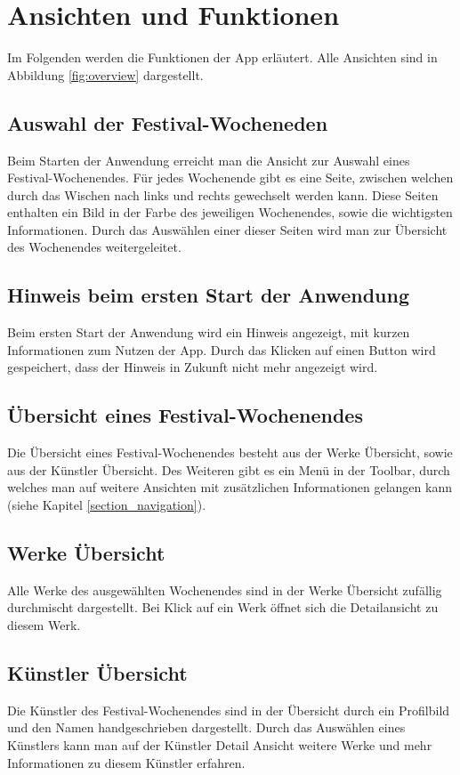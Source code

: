 \section{Ansichten und Funktionen}
Im Folgenden werden die Funktionen der App erläutert. Alle Ansichten sind in Abbildung \ref{fig:overview} dargestellt.

\subsection{Auswahl der Festival-Wocheneden}
Beim Starten der Anwendung erreicht man die Ansicht zur Auswahl eines Festival-Wochenendes. Für jedes Wochenende gibt es eine Seite, zwischen welchen durch das Wischen nach links und rechts gewechselt werden kann. Diese Seiten enthalten ein Bild in der Farbe des jeweiligen Wochenendes, sowie die wichtigsten Informationen. Durch das Auswählen einer dieser Seiten wird man zur Übersicht des Wochenendes weitergeleitet.

\subsection{Hinweis beim ersten Start der Anwendung}
Beim ersten Start der Anwendung wird ein Hinweis angezeigt, mit kurzen Informationen zum Nutzen der App. Durch das Klicken auf einen Button wird gespeichert, dass der Hinweis in Zukunft nicht mehr angezeigt wird.

\subsection{Übersicht eines Festival-Wochenendes}
Die Übersicht eines Festival-Wochenendes besteht aus der Werke Übersicht, sowie aus der Künstler Übersicht. Des Weiteren gibt es ein Menü in der Toolbar, durch welches man auf weitere Ansichten mit zusätzlichen Informationen gelangen kann (siehe Kapitel \ref{section_navigation}).

\subsection{Werke Übersicht}
Alle Werke des ausgewählten Wochenendes sind in der Werke Übersicht zufällig durchmischt dargestellt. Bei Klick auf ein Werk öffnet sich die Detailansicht zu diesem Werk.

\subsection{Künstler Übersicht}
Die Künstler des Festival-Wochenendes sind in der Übersicht durch ein Profilbild und den Namen handgeschrieben dargestellt. Durch das Auswählen eines Künstlers kann man auf der Künstler Detail Ansicht weitere Werke und mehr Informationen zu diesem Künstler erfahren.

